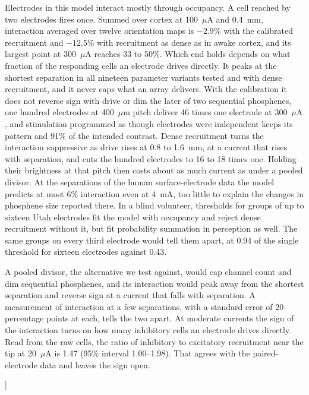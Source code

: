 \documentclass[10pt,twocolumn]{article}
\newcommand{\um}{\ensuremath{\mu\text{m}}}
\newcommand{\uA}{\ensuremath{\mu\text{A}}}
\begin{document}
\begin{@twocolumnfalse}
\begin{center}
\begin{minipage}{0.92\textwidth}
    \smallskip
    \noindent Electrodes in this model interact mostly through occupancy. A
    cell reached by two electrodes fires once. Summed over cortex at
    100~\uA{} and 0.4~mm, interaction averaged over twelve orientation maps
    is $-2.9$\% with the calibrated recruitment and $-12.5$\% with
    recruitment as dense as in awake cortex, and its largest point at
    300~\uA{} reaches 33 to 50\%. Which end holds depends on what fraction
    of the responding cells an electrode drives directly. It peaks at the
    shortest separation in all nineteen parameter variants tested and with
    dense recruitment, and it never caps what an array delivers. With the
    calibration it does not reverse sign with drive or dim the later of two
    sequential phosphenes, one hundred electrodes at 400~\um{} pitch
    deliver 46 times one electrode at 300~\uA, and stimulation programmed
    as though electrodes were independent keeps its pattern and 91\% of the
    intended contrast. Dense recruitment turns the interaction suppressive
    as drive rises at 0.8 to 1.6~mm, at a current that rises with
    separation, and cuts the hundred electrodes to 16 to 18 times one.
    Holding their brightness at that pitch then costs about as much current
    as under a pooled divisor. At the separations of the human
    surface-electrode data the model predicts at most 6\% interaction even at
    4~mA, too little to explain the changes in phosphene size reported
    there. In a blind volunteer, thresholds for groups of up to sixteen
    Utah electrodes fit the model with occupancy and reject dense
    recruitment without it, but fit probability summation in perception as
    well. The same groups on every third electrode would tell them apart,
    at 0.94 of the single threshold for sixteen electrodes against 0.43.

    \smallskip
    \noindent A pooled divisor, the alternative we test against, would cap
    channel count and dim sequential phosphenes, and its interaction would
    peak away from the shortest separation and reverse sign at a current
    that falls with separation. A measurement of interaction at a few separations, with a
    standard error of 20 percentage points at each, tells the two apart. At
    moderate currents the sign of the interaction turns on how many
    inhibitory cells an electrode drives directly. Read from the raw cells,
    the ratio of inhibitory to excitatory recruitment near the tip at
    20~\uA{} is 1.47 (95\% interval 1.00--1.98). That agrees with the
    paired-electrode data and leaves the sign open.
    \end{minipage}
    \end{center}
    \bigskip
  \end{@twocolumnfalse}
]
\end{document}
